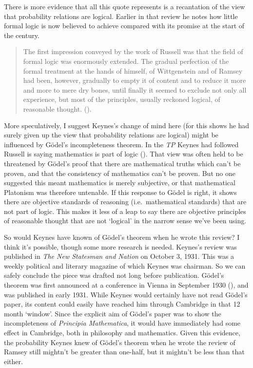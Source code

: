 \documentclass[
  10pt,
  letterpaper,
  DIV=11,
  numbers=noendperiod,
  twoside]{scrartcl}
\begin{document}
There is more evidence that all this quote represents is a recantation
of the view that probability relations are logical. Earlier in that
review he notes how little formal logic is now believed to achieve
compared with its promise at the start of the century.

\begin{quote}
The first impression conveyed by the work of Russell was that the field
of formal logic was enormously extended. The gradual perfection of the
formal treatment at the hands of himself, of Wittgenstein and of Ramsey
had been, however, gradually to empty it of content and to reduce it
more and more to mere dry bones, until finally it seemed to exclude not
only all experience, but most of the principles, usually reckoned
logical, of reasonable thought. ().
\end{quote}

More speculatively, I suggest Keynes's change of mind here (for this
shows he had surely given up the view that probability relations are
logical) might be influenced by Gödel's incompleteness theorem. In the
\emph{TP} Keynes had followed Russell is saying mathematics is part of
logic (). That view was
often held to be threatened by Gödel's proof that there are mathematical
truths which can't be proven, and that the consistency of mathematics
can't be proven. But no one suggested this meant mathematics is merely
subjective, or that mathematical Platonism was therefore untenable. If
this response to Gödel is right, it shows there are objective standards
of reasoning (i.e.~mathematical standards) that are not part of logic.
This makes it less of a leap to say there are objective principles of
reasonable thought that are not `logical' in the narrow sense we've been
using.

So would Keynes have known of Gödel's theorem when he wrote this review?
I think it's possible, though some more research is needed. Keynes's
review was published in \emph{The New Statesman and Nation} on October
3, 1931. This was a weekly political and literary magazine of which
Keynes was chairman. So we can safely conclude the piece was drafted not
long before publication. Gödel's theorem was first announced at a
conference in Vienna in September 1930 (), and was published in early 1931. While Keynes would certainly
have not read Gödel's paper, its content could easily have reached him
through Cambridge in that 12 month `window'. Since the explicit aim of
Gödel's paper was to show the incompleteness of \emph{Principia
Mathematica}, it would have immediately had some effect in Cambridge,
both in philosophy and mathematics. Given this evidence, the probability
Keynes knew of Gödel's theorem when he wrote the review of Ramsey still
mightn't be greater than one-half, but it mightn't be less than that
either.
\end{document}
